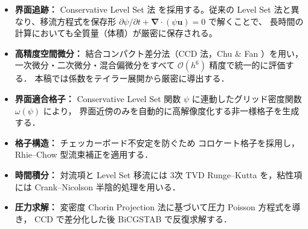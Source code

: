 \documentclass[12pt, a4paper, titlepage, xelatex, ja=standard]{bxjsarticle}
\newcommand{\bu}{\bm{u}}
\newcommand{\bnabla}{\bm{\nabla}}
\newcommand{\Ord}[1]{\mathcal{O}(#1)}
\begin{document}
\begin{itemize}
  \item \textbf{界面追跡：} Conservative Level Set 法 \cite{Olsson2005} 
        を採用する。従来の Level Set 法と異なり、移流方程式を保存形
        $\partial \psi/\partial t + \bnabla \cdot (\psi \bu) = 0$ で解くことで、
        長時間の計算においても全質量（体積）が厳密に保存される。
  \item \textbf{高精度空間微分：} 結合コンパクト差分法（CCD 法，Chu \& Fan \cite{ChuFan1998}）を用い，
        一次微分・二次微分・混合偏微分をすべて $\Ord{h^6}$ 精度で統一的に評価する．
        本稿では係数をテイラー展開から厳密に導出する．
  \item \textbf{界面適合格子：} Conservative Level Set 関数 $\psi$ に連動したグリッド密度関数 $\omega(\psi)$ により，
        界面近傍のみを自動的に高解像度化する非一様格子を生成する．
  \item \textbf{格子構造：} チェッカーボード不安定を防ぐため
        コロケート格子を採用し，Rhie--Chow 型流束補正を適用する．
  \item \textbf{時間積分：} 対流項と Level Set 移流には
        3次 TVD Runge--Kutta を，粘性項には Crank--Nicolson 半陰的処理を用いる．
  \item \textbf{圧力求解：} 変密度 Chorin Projection 法に基づいて圧力 Poisson 方程式を導き，
        CCD で差分化した後 BiCGSTAB で反復求解する．
\end{itemize}
\end{document}
